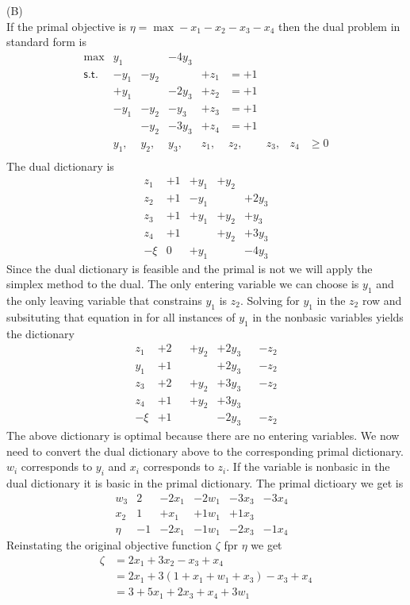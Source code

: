 \documentclass[11pt]{article}
\begin{document}
\medskip

\noindent (B)
\\
If the primal objective is $\eta = \max -x_1 - x_2 - x_3 - x_4$ then the dual problem in standard form is
\[\begin{array}{rllllllll}
\max & y_1 & & -4y_3 \\
\mathsf{s.t.} 
& -y_1 & -y_2 & & +z_1 & = +1 \\
& +y_1 & & -2y_3 & +z_2 & = +1 \\
& -y_1 & -y_2 & -y_3 & +z_3 & = +1 \\
& & -y_2 & -3y_3 & +z_4 & = +1 \\
& y_1, & y_2, & y_3, & z_1, & z_2, & z_3, & z_4 & \geq 0 \\
\end{array}\]
The dual dictionary is
\[\begin{array}{r|cccccccc}
z_1 & +1 & +y_1 & +y_2 \\
z_2 & +1 & -y_1 & & +2y_3 \\
z_3 & +1 & +y_1 & +y_2 & +y_3 \\
z_4 & +1 & & +y_2 & +3y_3 \\
\hline
-\xi & 0 & +y_1 & & -4y_3
\end{array}\]
Since the dual dictionary is feasible and the primal is not we will apply the simplex method to the dual.  The only entering variable we can choose is $y_1$ and the only leaving variable that constrains $y_1$ is $z_2$.  Solving for $y_1$ in the $z_2$ row and subsituting that equation in for all instances of $y_1$ in the nonbasic variables yields the dictionary
\[\begin{array}{r|cccccccc}
z_1 & +2 & & +y_2  & +2y_3 & & -z_2\\
y_1 & +1 & & & +2y_3 & & -z_2\\
z_3 & +2 & & +y_2 & +3y_3 & & -z_2 \\
z_4 & +1 & & +y_2 & +3y_3 \\
\hline
-\xi & +1 & & & -2y_3 & & -z_2
\end{array}\]
The above dictionary is optimal because there are no entering variables.  We now need to convert the dual dictionary above to the corresponding primal dictionary.  $w_i$ corresponds to $y_i$ and $x_i$ corresponds to $z_i$.  If the variable is nonbasic in the dual dictionary it is basic in the primal dictionary.  The primal dictioary we get is
\[\begin{array}{r|cccccccc}
w_3 & 2 & -2x_1 & -2w_1 & -3x_3 & -3x_4 \\
x_2 & 1 & +x_1 & +1w_1 & +1x_3 & & \\
\hline
\eta & -1 & -2x_1 & -1w_1 & -2x_3 & -1x_4
\end{array}\]
Reinstating the original objective function $\zeta$ fpr $\eta$ we get
\begin{align*}
\zeta & = 2x_1 + 3x_2  - x_3 + x_4 \\
& = 2x_1 + 3(1 +x_1 +w_1 +x_3) - x_3 + x_4 \\
& = 3 + 5x_1 + 2x_3 + x_4 + 3w_1 \\
\end{align*}
\end{document}
